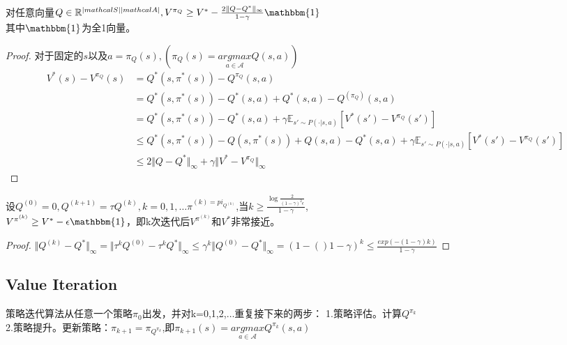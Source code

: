 \begin{lemma}
    对任意向量$Q\in \mathbb{R}^{|mathcal{S}||mathcal{A}|},V^{\pi_Q}\geq V^*-\frac{2\Vert Q-Q^*\Vert_\infty}{1-\gamma}\mathbbm{1}$
    \\其中$\mathbbm{1}$为全1向量。
 \end{lemma}
\begin{proof}
    对于固定的$s$以及$a=\pi_Q(s),(\pi_Q(s)=\underset{a\in \mathcal{A}}{argmax}Q(s,a))$
    \begin{equation}
        \begin{aligned}
            V^*(s)-V^{\pi_Q}(s)&=Q^*(s,\pi^*(s))-Q^{\pi_Q}(s,a)\\
            &=Q^*(s,\pi^*(s))-Q^*(s,a)+Q^*(s,a)-Q^(\pi_Q)(s,a)\\
            &=Q^*(s,\pi^*(s))-Q^*(s,a)+\gamma \mathbb{E}_{s'\sim P(\cdot |s,a)}[V^*(s')-V^{\pi_Q}(s')]\\
            &\leq Q^*(s,\pi^*(s))-Q(s,\pi^*(s))+Q(s,a)-Q^*(s,a)+\gamma \mathbb{E}_{s'\sim P(\cdot |s,a)}[V^*(s')-V^{\pi_Q}(s')]\\
            &\leq 2\Vert Q-Q^* \Vert_\infty+\gamma\Vert V^*-V^{\pi_Q}\Vert_\infty
        \end{aligned}
    \end{equation}
\end{proof}

\begin{theorem}
    设$Q^{(0)}=0,Q^{(k+1)}=\tau Q^{(k)},k=0,1,\ldots \pi^{(k)=pi_{Q^{(k)}}}$,当$k\geq \frac{\log \frac{2}{(1-\gamma )^2\epsilon}}{1-\gamma}$,\\
    $V^{\pi^{(k)}}\geq V^*-\epsilon \mathbbm{1}$，即k次迭代后$V^{\pi^{(k)}}$和$V^*$非常接近。
\end{theorem}
\begin{proof}
    $\Vert Q^{(k)}-Q^*\Vert_\infty=\Vert \tau ^kQ^{(0)}-\tau ^kQ^*\Vert_\infty \leq\gamma^k\Vert Q^{(0)}-Q^*\Vert_\infty=(1-()1-\gamma)^k\leq \frac{exp(-(1-\gamma)k)}{1-\gamma} $
\end{proof}

\subsection{Value Iteration}
策略迭代算法从任意一个策略$\pi_0$出发，并对k=0,1,2,$\ldots $重复接下来的两步：
1.策略评估。计算$Q^{\pi_k}$\\
2.策略提升。更新策略：$\pi_{k+1}=\pi_{Q^{\pi_k}}$,即$\pi_{k+1}(s)=\underset{a\in\mathcal{A}}{argmax}Q^{\pi_k}(s,a)$

